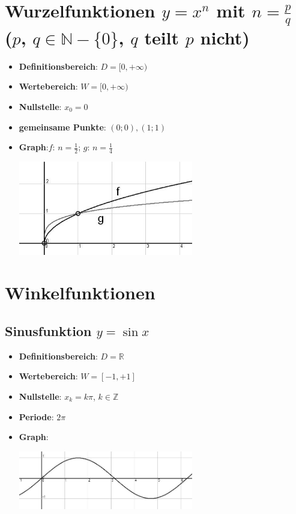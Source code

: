 \section*{Wurzelfunktionen $y = x^n $ mit $ n = \frac{p}{q}$ \\ ($p$, $q \in \mathbb{N}-\{0\}$, $ q $ teilt $ p $ nicht) }
\begin{itemize}
	\item \textbf{Definitionsbereich}: $ D = [0, +\infty) $
	\item \textbf{Wertebereich}: $ W = [0, +\infty) $
	\item \textbf{Nullstelle}: $x_0 = 0 $
	\item \textbf{gemeinsame Punkte}: $(0;0), (1;1) $
	\item \textbf{Graph}:$f$: $n = \frac{1}{2}$; $g$: $n=\frac{1}{4}$ \\
\begin{center}
		\includegraphics[width=0.60\textwidth]{img/WurzelF.jpg}
\end{center}
\end{itemize}

\section*{Winkelfunktionen}

\subsection*{Sinusfunktion $ y = \sin x $}
\begin{itemize}
	\item \textbf{Definitionsbereich}: $ D = \mathbb{R} $
	\item \textbf{Wertebereich}: $ W = [-1, +1] $
	\item \textbf{Nullstelle}: $x_k = k\pi $, $k \in \mathbb{Z}$
	\item \textbf{Periode}: $2\pi$
	\item \textbf{Graph}: \\
\begin{center}
		\includegraphics[width=0.60\textwidth]{img/SinF1.jpg}
\end{center}
\end{itemize}

